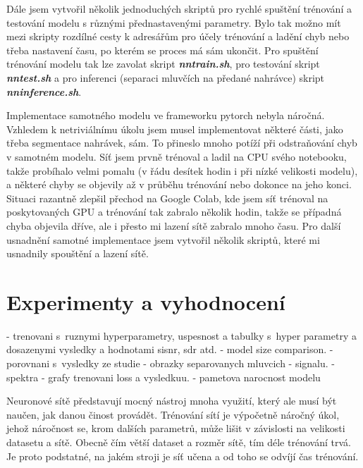 Dále jsem vytvořil několik jednoduchých skriptů pro rychlé spuštění trénování a testování modelu s různými přednastavenými parametry. Bylo tak možno mít mezi skripty rozdílné cesty k adresářům pro účely trénování a ladění chyb nebo třeba nastavení času, po kterém se proces má sám ukončit. Pro spuštění trénování modelu tak lze zavolat skript \textbf{\textit{nntrain.sh}}, pro testování skript \textbf{\textit{nntest.sh}} a pro inferenci (separaci mluvčích na předané nahrávce) skript \textbf{\textit{nninference.sh}}.


\bigskip

Implementace samotného modelu ve frameworku pytorch nebyla náročná. Vzhledem k netriviálnímu úkolu jsem musel implementovat některé části, jako třeba segmentace nahrávek, sám. To přineslo mnoho potíží při odstraňování chyb v samotném modelu. Síť jsem prvně trénoval a ladil na CPU svého notebooku, takže probíhalo velmi pomalu (v řádu desítek hodin i při nízké velikosti modelu), a některé chyby se objevily až v průběhu trénování nebo dokonce na jeho konci. Situaci razantně zlepšil přechod na Google Colab, kde jsem síť trénoval na poskytovaných GPU a trénování tak zabralo  několik hodin, takže se případná chyba objevila dříve, ale i přesto mi lazení sítě zabralo mnoho času. Pro další usnadnění samotné implementace jsem vytvořil několik skriptů, které mi usnadnily spouštění a lazení sítě.



\chapter{Experimenty a vyhodnocení}
\label{experimenty}
- trenovani s~ruznymi hyperparametry, uspesnost a tabulky s~hyper parametry a dosazenymi vysledky a hodnotami sisnr, sdr atd.
- model size comparison.
- porovnani s~vysledky ze studie
- obrazky separovanych mluvcich - signalu.
- spektra
- grafy trenovani loss a vysledkuu.
- pametova narocnost modelu


Neuronové sítě představují mocný nástroj mnoha využití, který ale musí být naučen, jak danou činost provádět. Trénování sítí je výpočetně náročný úkol, jehož náročnost se, krom dalších parametrů, může lišit v závislosti na velikosti datasetu a sítě. Obecně čím větší dataset a rozměr sítě, tím déle trénování trvá. Je proto podstatné, na jakém stroji je síť učena a od toho se odvíjí čas trénování.

